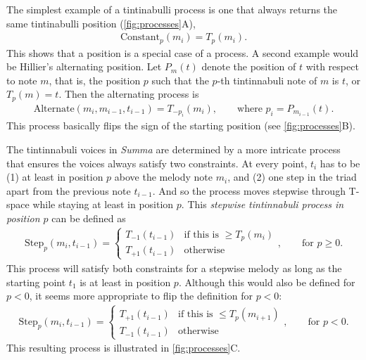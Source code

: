 \documentclass{interact}
\begin{document}
The simplest example of a tintinabulli process is one that always returns the same tintinabulli position (\autoref{fig:processes}A),
\begin{align}
    \text{Constant}_p(m_i)
        = T_p(m_i).
\end{align}
This shows that a position is a special case of a process. 
A second example would be Hillier's alternating position.
Let $P_m(t)$ denote the position of $t$ with respect to note $m$, that is, the position $p$ such that the $p$-th tintinnabuli note of $m$ is $t$, or $T_p(m) = t$.
Then the alternating process is
\begin{align}
    \text{Alternate}(m_i, m_{i-1}, t_{i-1})
        = T_{-p_i}(m_i),
    \qquad \text{where $p_i = P_{m_{i-1}}(t)$}.
\end{align}
This process basically flips the sign of the starting position (see \autoref{fig:processes}B).

The tintinnabuli voices in \emph{Summa} are determined by a more intricate process that ensures the voices always satisfy two constraints. 
At every point, $t_i$ has to be (1) at least in position $p$ above the melody note $m_i$, and (2) one step in the triad apart from the previous note $t_{i-1}$.
And so the process moves stepwise through T-space while staying at least in position $p$.
This \emph{stepwise tintinnabuli process in position $p$} can be defined as
\begin{align}
    \text{Step}_p(m_i, t_{i-1})
        = \begin{cases}
        T_{-1}( t_{i-1} )  &\text{if this is $\ge T_p(m_{i})$}\\
        T_{+1}( t_{i-1} )  &\text{otherwise}
    \end{cases}, \qquad \text{for $p \ge 0$.}
\end{align}
This process will satisfy both constraints for a stepwise melody as long as the starting point $t_1$ is at least in position $p$.
Although this would also be defined for $p<0$, it seems more appropriate to flip the definition for $p<0$:
\begin{align}
    \text{Step}_p(m_i, t_{i-1})
        = \begin{cases}
        T_{+1}( t_{i-1} )  &\text{if this is $\le T_p(m_{i+1})$}\\
        T_{-1}( t_{i-1} )  &\text{otherwise}
    \end{cases}, \qquad \text{for $p < 0$}.
\end{align}
This resulting process is illustrated in \autoref{fig:processes}C.
\end{document}
